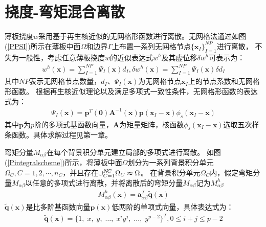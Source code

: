 \section{挠度-弯矩混合离散}
薄板挠度$w$采用基于再生核近似的无网格形函数进行离散。无网格法通过如图(\ref{PPSI})所示在薄板中面$\Omega$和边界$\Gamma$上布置一系列无网格节点$\{\pmb{x}_I\}^{N\!P}_{I=1}$进行离散，
不失为一般性，考虑任意薄板挠度$w$的近似表达式$w^h$及其虚位移$\delta w^h$可表示为：
\begin{equation}\label{w}
\begin{split}
    w^h(\pmb{x})=\sum_{I=1}^{N\!P}\Psi_I(\pmb{x})d_{I},\delta w^h(\pmb{x})=\sum_{I=1}^{N\!P}\Psi_I(\pmb{x})\delta d_I
\end{split}
\end{equation}
其中$N\!P$表示无网格节点数量，$d_I$、$\Psi_I(\pmb{x})$为无网格节点$\pmb{x}_I$上的节点系数和无网格形函数。
根据再生核近似理论\cite{}以及满足多项式一致性条件，无网格形函数的表达式为：
\begin{equation}
\begin{split}
    \Psi_I(\pmb{x})=\pmb{p}^T(\pmb{0})\pmb{A}^{-1}(\pmb{x})\pmb{p}(\pmb{x}_I-\pmb{x})\phi_s(\pmb{x}_I-\pmb{x})
\end{split}
\end{equation}
其中$\pmb{p}$为$p$阶的多项式基函数向量，$\pmb{A}$为矩量矩阵，核函数$\phi_s(\pmb{x}_I-\pmb{x})$选取五次样条函数。具体求解过程见第一章。\par
弯矩分量$M_{\alpha\beta}$在每个背景积分单元建立局部的多项式进行离散。
如图(\ref{Pintegralscheme})所示，将薄板中面$\Omega$划分为一系列背景积分单元$\Omega_C,C=1,2,\dotsb,n_C$，并且存在$\cup_{C=1}^{N\!C}\Omega_C\thickapprox\Omega$。
在背景积分单元$\Omega_C$内，假定弯矩分量$M_{\alpha\beta}$以任意的多项式进行离散，并将离散后的弯矩分量$M_{\alpha\beta}$记为$M_{\alpha\beta}^h$
\begin{equation}\label{moment}
\begin{split}
    M^h_{\alpha\beta}(\pmb{x})=\pmb{a}_{\alpha\beta}^T\tilde{\pmb{q}}(\pmb{x})
\end{split}
\end{equation}
$\tilde{\pmb{q}}(\pmb{x})$是比多阶基函数向量$\pmb{p}(\pmb{x})$低两阶的单项式向量，具体表达式为：
\begin{equation}
\begin{split}
    \tilde{\pmb{q}}(\pmb{x})=\{1,\;x,\;y,\;\dots,\;x^iy^j,\;\dots,\;y^{p-2}\}^T,0 \le i+j \le p-2
\end{split}
\end{equation}\par
